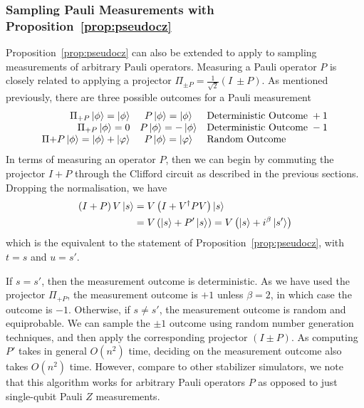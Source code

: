 \subsubsection*{Sampling Pauli Measurements with Proposition~\ref{prop:pseudocz}}
Proposition~\ref{prop:pseudocz} can also be extended to apply to sampling measurements of arbitrary Pauli operators. Measuring a Pauli operator $P$ is closely related to applying a projector $\Pi_{\pm P}=\frac{1}{\sqrt{2}}\left(I\ \pm P\right)$. As mentioned previously, there are three possible outcomes for a Pauli measurement
\[
\begin{array}{r c l}
\Pi_{+P}\ket{\phi} = \ket{\phi} & P\ket{\phi} = \ket{\phi} & \text{Deterministic Outcome}\;+1\\
\Pi_{+P}\ket{\phi} = 0 & P\ket{\phi} = -\ket{\phi} & \text{Deterministic Outcome}\; -1\\
\Pi{+P}\ket{\phi} = \ket{\phi}+\ket{\varphi} & P\ket{\phi}=\ket{\varphi} & \text{Random Outcome} \\
\end{array}
\]
In terms of measuring an operator $P$, then we can begin by commuting the projector $I+P$ through the Clifford circuit as described in the previous sections. Dropping the normalisation, we have
\begin{align*}
\left(I+P\right)V\ket{s} &= V\left(I+V^{\dagger}PV\right)\ket{s} \\
& = V\left(\ket{s}+P'\ket{s}\right) = V\left(\ket{s}+i^{\beta}\ket{s'}\right)
\end{align*}
which is the equivalent to the statement of Proposition~\ref{prop:pseudocz}, with $t=s$ and $u=s'$.\par
If $s=s'$, then the measurement outcome is deterministic. As we have used the projector $\Pi_{+P}$, the measurement outcome is $+1$ unless $\beta=2$, in which case the outcome is $-1$. Otherwise, if $s\neq s'$, the measurement outcome is random and equiprobable. We can sample the $\pm 1$ outcome using random number generation techniques, and then apply the corresponding projector $\left(I\pm P\right)$. As computing $P'$ takes in general $O(n^{2})$ time, deciding on the measurement outcome also takes $O(n^{2})$ time. However, compare to other stabilizer simulators, we note that this algorithm works for arbitrary Pauli operators $P$ as opposed to just single-qubit Pauli $Z$ measurements.
